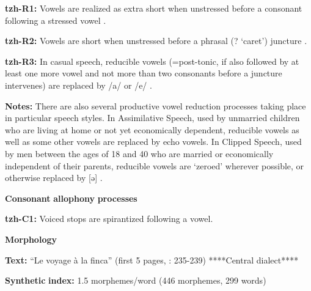 \begin{styleBody}
\textbf{tzh-R1:} Vowels are realized as extra short when unstressed before a consonant following a stressed vowel \citep[12]{Kaufman1971}.
\end{styleBody}

\begin{styleBody}
\textbf{tzh-R2:} Vowels are short when unstressed before a phrasal (? ‘caret’) juncture \citep[12]{Kaufman1971}.
\end{styleBody}

\begin{styleBody}
\textbf{tzh-R3:} In casual speech, reducible vowels (=post-tonic, if also followed by at least one more vowel and not more than two consonants before a juncture intervenes) are replaced by /a/ or /e/ \citep[26-7]{Kaufman1971}.
\end{styleBody}

\begin{styleBody}
\textbf{Notes:} There are also several productive vowel reduction processes taking place in particular speech styles. In Assimilative Speech, used by unmarried children who are living at home or not yet economically dependent, reducible vowels as well as some other vowels are replaced by echo vowels. In Clipped Speech, used by men between the ages of 18 and 40 who are married or economically independent of their parents, reducible vowels are ‘zeroed’ wherever possible, or otherwise replaced by [ə] \citep[26-7]{Kaufman1971}.
\end{styleBody}

\begin{styleBody}
\textbf{Consonant} \textbf{allophony} \textbf{processes}
\end{styleBody}

\begin{styleBody}
\textbf{tzh-C1:} Voiced stops are spirantized following a vowel. \citep[11]{Kaufman1971}
\end{styleBody}

\begin{styleBody}
\textbf{Morphology}
\end{styleBody}

\begin{styleBody}
\textbf{Text:} “Le voyage à la finca” (first 5 pages, \citealt{Polian2006}: 235-239) ****Central dialect****
\end{styleBody}

\begin{styleBody}
\textbf{Synthetic} \textbf{index:} 1.5 morphemes/word (446 morphemes, 299 words)
\end{styleBody}

